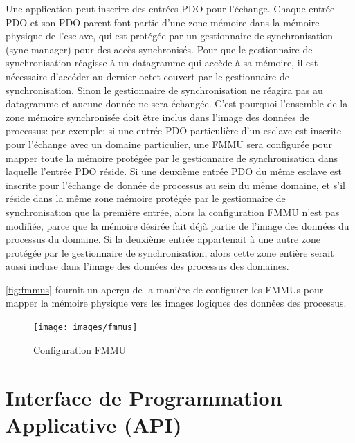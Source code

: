 \documentclass[a4paper,12pt,BCOR=6mm,bibtotoc,idxtotoc]{scrbook}
\begin{document}
Une application peut inscrire des entr\'ees PDO pour l'\'echange.
Chaque entr\'ee PDO et son PDO parent font partie d'une zone m\'emoire
dans la m\'emoire physique de l'esclave, qui est prot\'eg\'ee par un
gestionnaire de synchronisation (sync manager) \cite[sec.~6.7]{dlspec}
pour des acc\`es synchronis\'es.  Pour que le gestionnaire de
synchronisation r\'eagisse \`a un datagramme qui acc\`ede \`a sa
m\'emoire, il est n\'ecessaire d'acc\'eder au dernier octet couvert
par le gestionnaire de synchronisation. Sinon le gestionnaire de
synchronisation ne r\'eagira pas au datagramme et aucune donn\'ee ne
sera \'echang\'ee.  C'est pourquoi l'ensemble de la zone m\'emoire
synchronis\'ee doit \^etre inclus dans l'image des donn\'ees de
processus: par exemple; si une entr\'ee PDO particuli\`ere d'un
esclave est inscrite pour l'\'echange avec un domaine particulier, une
FMMU sera configur\'ee pour mapper toute la m\'emoire prot\'eg\'ee par
le gestionnaire de synchronisation dans laquelle l'entr\'ee PDO
r\'eside. Si une deuxi\`eme entr\'ee PDO du m\^eme esclave est
inscrite pour l'\'echange de donn\'ee de processus au sein du m\^eme
domaine, et s'il r\'eside dans la m\^eme zone m\'emoire prot\'eg\'ee
par le gestionnaire de synchronisation que la premi\`ere entr\'ee,
alors la configuration FMMU n'est pas modifi\'ee, parce que la
m\'emoire d\'esir\'ee fait d\'ej\`a partie de l'image des donn\'ees du
processus du domaine. Si la deuxi\`eme entr\'ee appartenait \`a une
autre zone prot\'eg\'ee par le gestionnaire de synchronisation, alors
cette zone enti\`ere serait aussi incluse dans l'image des donn\'ees
des processus des domaines.

\autoref{fig:fmmus} fournit un aper\c{c}u de la mani\`ere de
configurer les FMMUs pour mapper la m\'emoire physique vers les images
logiques des donn\'ees des processus.

\begin{figure}[htbp]
  \centering
  \texttt{[image: images/fmmus]}
  \caption{Configuration FMMU}
  \label{fig:fmmus}
\end{figure}


\chapter{Interface de Programmation Applicative (API)}
\label{chap:api}

%
\end{document}
